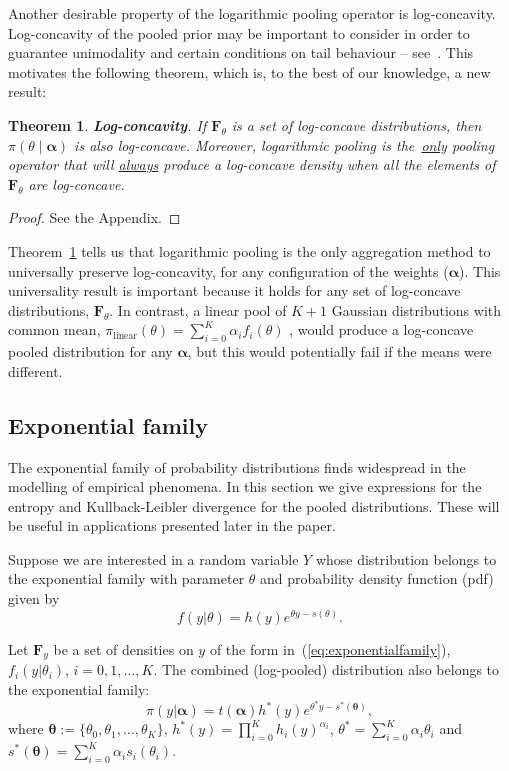\documentclass[12pt]{article}
\newtheorem{theo}{Theorem}[]
\begin{document}
Another desirable property of the logarithmic pooling operator is log-concavity.
Log-concavity of the pooled prior may be important to consider in order to guarantee unimodality and certain conditions on tail behaviour -- see~\textcite{Bagnoli2005}.
This motivates the following theorem, which is, to the best of our knowledge, a new result:
\begin{theo}
\label{thm:concavity}
\textbf{Log-concavity}. 
If $\mathbf{F}_{\theta}$ is a set of log-concave distributions, then $\pi(\theta\mid \boldsymbol \alpha)$ is also log-concave.
Moreover, logarithmic pooling is the~\underline{only} pooling operator that will \underline{always} produce a log-concave density when all the elements of $\mathbf{F}_{\theta}$  are log-concave.
\end{theo}
\begin{proof}
 See the Appendix.
\end{proof} 
Theorem~\ref{thm:concavity} tells us that logarithmic pooling is the only aggregation method to universally preserve log-concavity, for any configuration of the weights ($\boldsymbol{\alpha}$).
This universality result is important because it holds for any set of log-concave distributions, $\mathbf{F}_{\theta}$.
In contrast, a linear pool of $K + 1$ Gaussian distributions with common mean, $\pi_{\text{linear}}(\theta) = \sum_{i=0}^K \alpha_i f_i(\theta)$ , would produce a log-concave pooled distribution for any $\boldsymbol{\alpha}$, but this would potentially fail if the means were different.

\subsection{Exponential family}
\label{sec:expofamily}

The exponential family of probability distributions finds widespread in the modelling of empirical phenomena.
In this section we give expressions for the entropy and Kullback-Leibler divergence for the pooled distributions. 
These will be useful in applications presented later in the paper.

Suppose we are interested in a random variable $Y$ whose distribution belongs to the exponential family with parameter $\theta$ and probability density function (pdf) given by
\begin{equation}
\label{eq:exponentialfamily}
f(y|\theta) = h(y) e^{\theta y - s(\theta)}.
\end{equation}

Let $\mathbf{F}_{y}$ be a set of densities on $y$ of the form in~(\ref{eq:exponentialfamily}), $f_i(y|\theta_i)$, $ i = 0, 1, \ldots, K$. 
The combined (log-pooled) distribution also belongs to the exponential family:
\begin{equation}
\label{eq:pooldistEF}
\pi(y| \boldsymbol\alpha ) = t(\boldsymbol\alpha) h^\ast (y) e^{\theta^\ast y - s^\ast (\boldsymbol\theta)},
\end{equation}
where $\boldsymbol\theta :=\{\theta_0, \theta_1, \ldots, \theta_K \}$, $h^\ast (y) = \prod_{i = 0}^K h_i(y)^{\alpha_i}$,  $\theta^\ast = \sum_{i = 0}^K \alpha_i \theta_i$ and $s^\ast (\boldsymbol\theta) = \sum_{i = 0}^K \alpha_i s_i(\theta_i)$.
\end{document}
